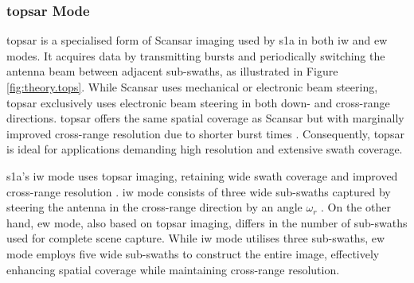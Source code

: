 \subsubsection{\acs{topsar} Mode}

\ac{topsar} is a specialised form of Scan\acs{sar} imaging used by \acs{s1a} in both \ac{iw} and \ac{ew} modes. It acquires data by transmitting bursts and periodically switching the antenna beam between adjacent sub-swaths, as illustrated in Figure \ref{fig:theory.tops}. While Scan\acs{sar} uses mechanical or electronic beam steering, \acs{topsar} exclusively uses electronic beam steering in both down- and cross-range directions. \acs{topsar} offers the same spatial coverage as Scan\acs{sar} but with marginally improved cross-range resolution due to shorter burst times \cite{DeZan2006}. Consequently, \acs{topsar} is ideal for applications demanding high resolution and extensive swath coverage.

\acs{s1a}'s \acs{iw} mode uses \acs{topsar} imaging, retaining wide swath coverage and improved cross-range resolution \cite{sentinel1ProductDef}. \acs{iw} mode consists of three wide sub-swaths captured by steering the antenna in the cross-range direction by an angle $\omega_{r}$ \cite{sentinel1ProductDef}. On the other hand, \acs{ew} mode, also based on \acs{topsar} imaging, differs in the number of sub-swaths used for complete scene capture. While \acs{iw} mode utilises three sub-swaths, \acs{ew} mode employs five wide sub-swaths to construct the entire image, effectively enhancing spatial coverage while maintaining cross-range resolution.



